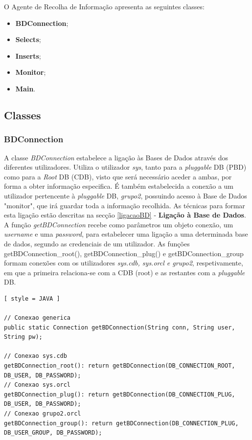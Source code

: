 \documentclass[a4paper]{article}
\begin{document}
O Agente de Recolha de Informação apresenta as seguintes classes:
\begin{itemize}
    \item \textbf{BDConnection};
    \item \textbf{Selects};
    \item \textbf{Inserts};
    \item \textbf{Monitor};
    \item \textbf{Main}.
\end{itemize}

\subsection{Classes}

\subsubsection{BDConnection}
\label{bdconnection}
\hspace{3mm} 

A classe \emph{BDConnection} estabelece a ligação às Bases de Dados através dos diferentes utilizadores.  Utiliza o utilizador \emph{sys}, tanto para a \emph{pluggable} DB (PBD) como para a \emph{Root} DB (CDB), visto que será necessário aceder a ambas, por forma a obter informação especifica. 
É também  estabelecida a conexão a um utilizador pertencente à \emph{pluggable} DB, \emph{grupo2}, possuindo acesso à Base de Dados "monitor",  que irá guardar toda a informação recolhida.
As técnicas para formar esta ligação estão descritas na secção \ref{ligacaoBD} - \textbf{Ligação à Base de Dados}.\\

A função \emph{getBDConnection} recebe como parâmetros um objeto conexão, um \emph{username} e uma \emph{password}, para estabelecer uma ligação a uma determinada base de dados, segundo as credenciais de um utilizador. As funções getBDConnection\_root(), getBDConnection\_plug() e getBDConnection\_group formam conexões com os utilizadores \emph{sys.cdb, sys.orcl e grupo2}, respetivamente, em que a primeira relaciona-se com a CDB (root) e as restantes com a \emph{pluggable} DB.

\begin{lstlisting}[ style = JAVA ]

// Conexao generica
public static Connection getBDConnection(String conn, String user, String pw);

// Conexao sys.cdb
getBDConnection_root(): return getBDConnection(DB_CONNECTION_ROOT, DB_USER, DB_PASSWORD);
// Conexao sys.orcl
getBDConnection_plug(): return getBDConnection(DB_CONNECTION_PLUG, DB_USER, DB_PASSWORD);
// Conexao grupo2.orcl
getBDConnection_group(): return getBDConnection(DB_CONNECTION_PLUG, DB_USER_GROUP, DB_PASSWORD);

\end{lstlisting}
\end{document}

